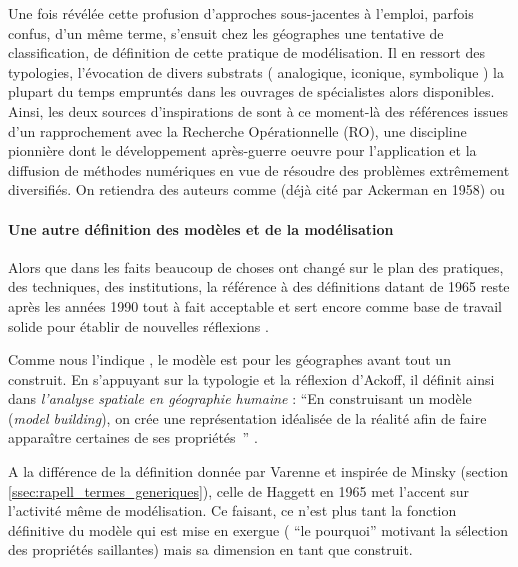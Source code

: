 Une fois révélée cette profusion d'approches sous-jacentes à l'emploi, parfois confus, d'un même terme, s'ensuit chez les géographes une tentative de classification, de définition de cette pratique de modélisation. Il en ressort des typologies, l'évocation de divers substrats ( analogique, iconique, symbolique ) la plupart du temps empruntés dans les ouvrages de spécialistes alors disponibles. Ainsi, les deux sources d'inspirations de \textcites[106]{Berry1963}{Haggett1965} sont à ce moment-là des références issues d'un rapprochement avec la Recherche Opérationnelle (RO), une discipline pionnière dont le développement après-guerre oeuvre pour l'application et la diffusion de méthodes numériques en vue de résoudre des problèmes extrêmement diversifiés. On retiendra des auteurs comme \textcite{Ackoff1962} (déjà cité par Ackerman en 1958) ou \textcite{Kemeny1962}

\paragraph{Une autre définition des modèles et de la modélisation}
\label{p:autre_def_modele}

Alors que dans les faits beaucoup de choses ont changé sur le plan des pratiques, des techniques, des institutions, la référence à des définitions datant de 1965 reste après les années 1990 tout à fait acceptable \autocites{Dastes2001b, Antony2013}[295]{Bailly1995} et sert encore comme base de travail solide pour établir de nouvelles réflexions \autocite{Brunet2000}.

Comme nous l'indique \textcite{Haggett1965}, le modèle est pour les géographes avant tout un construit. En s'appuyant sur la typologie et la réflexion d'Ackoff, il définit ainsi dans \textit{l'analyse spatiale en géographie humaine} : \enquote{En construisant un modèle (\textit{model building}), on crée une représentation idéalisée de la réalité afin de faire apparaître certaines de ses propriétés } \autocite[30]{Haggett1965}.


A la différence de la définition donnée par Varenne et inspirée de Minsky (section \ref{ssec:rapell_termes_generiques}), celle de Haggett en 1965 met l'accent sur l'activité même de modélisation. Ce faisant, ce n'est plus tant la fonction définitive du modèle qui est mise en exergue ( \enquote{le pourquoi} motivant la sélection des propriétés saillantes) mais sa dimension en tant que construit.

